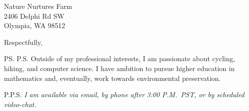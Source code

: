 \documentclass{letter}
\begin{document}
\begin{letter}{Nature Nurtures Farm \\ 2406 Delphi Rd SW \\ Olympia, WA 98512}
\closing{Respectfully,}
\ps P.S. Outside of my professional interests, I am passionate about cycling, hiking, and computer science. I have ambition to pursue higher education in mathematics and, eventually, work towards environmental preservation. 

P.P.S. \emph{I am available via email, by phone after 3:00 P.M.\ PST, or by scheduled video-chat.}

\end{letter}
\end{document}
